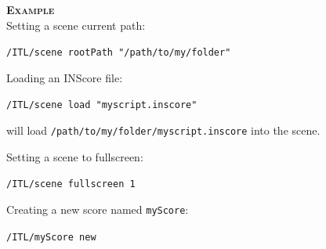 \documentclass[a4paper,twoside]{report}
\newcommand{\sublevel}[1]	{\section{#1}}
\newcommand{\OSC}[1]		{\texttt{#1}}
\newcommand{\example}		{\textbf{\hspace{-1.5cm}\textbf{\textsc{Example }}}}
\newcommand{\sample}	[1]			{\vspace{-2mm}\begin{center}\colorbox{mygrey}{
								\begin{minipage}[t]{0.9\columnwidth} 
								{\small \texttt{#1}}
								\end{minipage}}\end{center}}
\newcommand{\sampleindent}	{ \hspace{0.5cm} }
\begin{document}
\example \\
Setting a scene current path:
\sample{/ITL/scene rootPath "/path/to/my/folder"}
Loading an INScore file:
\sample{/ITL/scene load "myscript.inscore"}
\sampleindent will load \OSC{/path/to/my/folder/myscript.inscore} into the scene. 

Setting a scene to fullscreen:
\sample{/ITL/scene fullscreen 1}
Creating a new score named \OSC{myScore}:
\sample{/ITL/myScore new}



%





%
%

\end{document}

